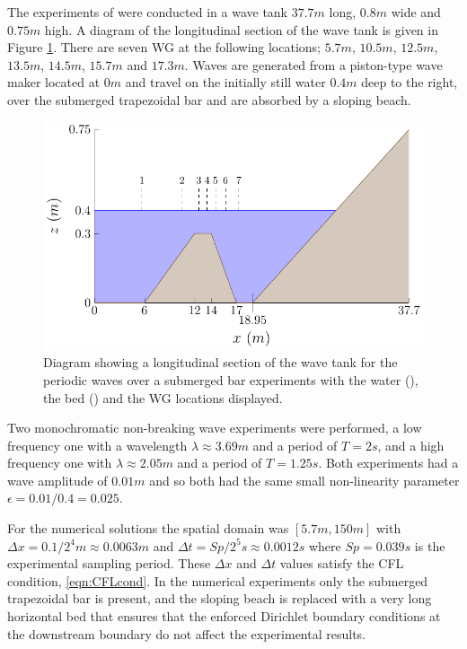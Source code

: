 The experiments of \citet{Beji-Battjes-1994-1} were conducted in a wave tank $37.7m$ long, $0.8m$ wide and $0.75m$ high. A diagram of the longitudinal section of the wave tank is given in Figure \ref{fig:BejiWT}. There are seven WG at the following locations; $5.7m$, $10.5m$, $12.5m$, $13.5m$, $14.5m$, $15.7m$ and $17.3m$. Waves are generated from a piston-type wave maker located at $0m$ and travel on the initially still water $0.4m$ deep to the right, over the submerged trapezoidal bar and are absorbed by a sloping beach.
\begin{figure}
	\centering
	\includegraphics[width=\textwidth]{./chp6/figures/Experiment/Beji/BejiTank.pdf}
	\caption{Diagram showing a longitudinal section of the wave tank for the periodic waves over a submerged bar experiments with the water (), the bed () and the WG locations displayed.}
	\label{fig:BejiWT}
\end{figure}

Two monochromatic non-breaking wave experiments were performed, a low frequency one with a wavelength $\lambda \approx 3.69m$ and a period of $T = 2s$, and a high frequency one with $\lambda \approx 2.05m$ and a period of $T = 1.25s$. Both experiments had a wave amplitude of $0.01m$ and so both had the same small non-linearity parameter $\epsilon = 0.01 / 0.4 = 0.025$. 

For the numerical solutions the spatial domain was $\left[5.7m,150m\right]$ with $\Delta x = 0.1 / 2^4 m \approx 0.0063m$ and $\Delta t = Sp / 2^5 s \approx 0.0012s$ where $Sp = 0.039 s$ is the experimental sampling period. These $\Delta x$ and $\Delta t$ values satisfy the CFL condition, \eqref{eqn:CFLcond}. In the numerical experiments only the submerged trapezoidal bar is present, and the sloping beach is replaced with a very long horizontal bed that ensures that the enforced Dirichlet boundary conditions at the downstream boundary do not affect the experimental results.

